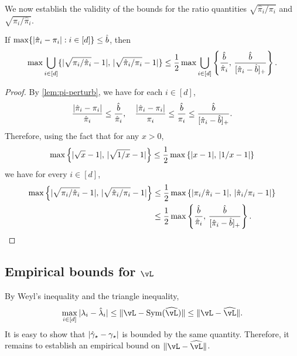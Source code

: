 We now establish the validity of the bounds for the ratio quantities
$\sqrt{\hat\pi_i/\pi_i}$ and $\sqrt{\pi_i/\hat\pi_i}$.
\begin{lemma}
  \label{lem:pi-ratio-perturb}
  If $\max\{|\hat\pi_i-\pi_i| : i \in [d]\} \leq \hat{b}$,
  then
  \begin{equation}
    \max\bigcup_{i\in[d]}
    \{
      |\sqrt{\pi_i/\hat\pi_i}-1|,\,
      |\sqrt{\hat\pi_i/\pi_i}-1|
    \}
    \leq
    \frac12 \max \bigcup_{i\in[d]}
    \left\{
      \frac{\hat{b}}{\hat\pi_i},\,
      \frac{\hat{b}}{[\hat\pi_i-\hat{b}]_+}
    \right\}
    .
    \notag
  \end{equation}
\end{lemma}
\begin{proof}
  By \cref{lem:pi-perturb}, we have for each $i \in [d]$,
  \begin{equation}
    \frac{|\hat\pi_i - \pi_i|}{\hat\pi_i}
    \leq \frac{\hat{b}}{\hat\pi_i}
    , \quad
    \frac{|\hat\pi_i - \pi_i|}{\pi_i}
    \leq
    \frac{\hat{b}}{\pi_i}
    \leq
    \frac{\hat{b}}{[\hat{\pi}_i-\hat{b}]_+}
    .
    \notag
  \end{equation}
  Therefore, using the fact that for any $x>0$,
  \[
    \max\left\{
      |\sqrt{x}-1| ,\, |\sqrt{1/x}-1|
    \right\} \leq \frac12 \max\left\{ |x-1| ,\, |1/x-1| \right\}
  \]
  we have for every $i \in [d]$,
  \begin{align*}
    \max\left\{
      |\sqrt{\pi_i/\hat\pi_i}-1|
      ,\,
      |\sqrt{\hat\pi_i/\pi_i}-1|
    \right\}
    & \leq
    \frac12 \max\left\{
      |\pi_i/\hat\pi_i-1|
      ,\,
      |\hat\pi_i/\pi_i-1|
    \right\}
    \\
    & \leq
    \frac12 \max\left\{
      \frac{\hat{b}}{\hat\pi_i}
      ,\,
      \frac{\hat{b}}{[\hat{\pi}_i-\hat{b}]_+}
    \right\}
    .
    \qedhere
  \end{align*}
\end{proof}


\subsection{Empirical bounds for $\vL$}

By Weyl's inequality and the triangle inequality,
\[
  \max_{i \in [d]} |\lambda_i - \hat\lambda_i|
  \leq \norm{\vL - \Sym(\wh\vL)}
  \leq \norm{\vL - \wh\vL} .
\]
It is easy to show that $|\hat\gamma_{\star} - \gamma_{\star}|$ is bounded by the same
quantity.
Therefore, it remains to establish an empirical bound on $\norm{\vL -
\wh\vL}$.

